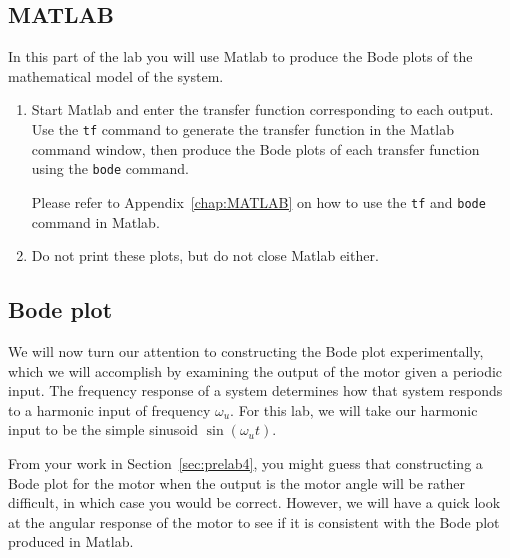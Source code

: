 \subsection{MATLAB}

In this part of the lab you will use \textsf{Matlab} to produce the Bode
plots of the mathematical model of the system.

\begin{enumerate}
    \item Start \textsf{Matlab} and enter the transfer function corresponding to
          each output.  Use the \verb|tf| command to generate the transfer function in
          the \textsf{Matlab} command window, then produce the Bode plots of each
          transfer function using the \verb|bode| command.

          Please refer to Appendix~\ref{chap:MATLAB} on how to use the
          \verb|tf| and \verb|bode| command in \textsf{Matlab}.
    \item Do not print these plots, but do not close \textsf{Matlab} either.
\end{enumerate}

\subsection{Bode plot}

We will now turn our attention to constructing the Bode plot experimentally,
which we will accomplish by examining the output of the motor given a
periodic input.  The frequency response of a system determines how that
system responds to a harmonic input of frequency \(\omega_u\).  For this lab,
we will take our harmonic input to be the simple sinusoid \(\sin(\omega_u t)\).

From your work in Section~\ref{sec:prelab4}, you might guess that
constructing a Bode plot for the motor when the output is the motor angle
will be rather difficult, in which case you would be correct.  However, we
will have a quick look at the angular response of the motor to see if it is
consistent with the Bode plot produced in \textsf{Matlab}.

